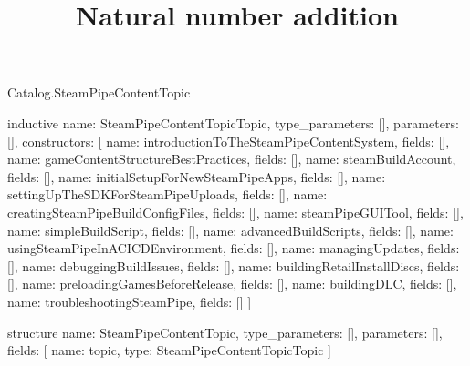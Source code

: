 \begin{lexlean}{Catalog.SteamPipeContentTopic}
\title{Natural number addition}
\begin{semanticmodule}
inductive{
  name: SteamPipeContentTopicTopic,
  type_parameters: [],
  parameters: [],
  constructors: [
    {name: introductionToTheSteamPipeContentSystem, fields: []},
    {name: gameContentStructureBestPractices, fields: []},
    {name: steamBuildAccount, fields: []},
    {name: initialSetupForNewSteamPipeApps, fields: []},
    {name: settingUpTheSDKForSteamPipeUploads, fields: []},
    {name: creatingSteamPipeBuildConfigFiles, fields: []},
    {name: steamPipeGUITool, fields: []},
    {name: simpleBuildScript, fields: []},
    {name: advancedBuildScripts, fields: []},
    {name: usingSteamPipeInACICDEnvironment, fields: []},
    {name: managingUpdates, fields: []},
    {name: debuggingBuildIssues, fields: []},
    {name: buildingRetailInstallDiscs, fields: []},
    {name: preloadingGamesBeforeRelease, fields: []},
    {name: buildingDLC, fields: []},
    {name: troubleshootingSteamPipe, fields: []}
  ]
}

structure{
  name: SteamPipeContentTopic,
  type_parameters: [],
  parameters: [],
  fields: [
    {name: topic, type: SteamPipeContentTopicTopic}
  ]
}
\end{semanticmodule}
\end{lexlean}
